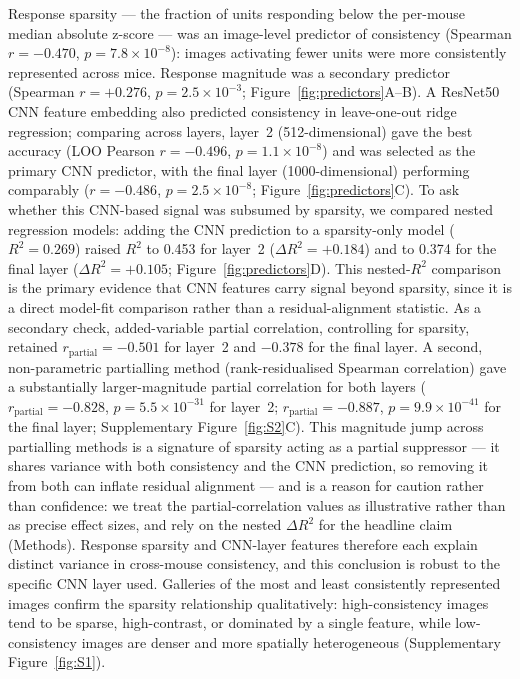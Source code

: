 \documentclass[11pt,onecolumn]{article}
\begin{document}
Response sparsity --- the fraction of units responding below the
per-mouse median absolute z-score --- was an image-level predictor of
consistency (Spearman $r = -0.470$,
$p = 7.8 \times 10^{-8}$): images activating fewer units were more
consistently represented across mice.  Response magnitude was a
secondary predictor (Spearman $r = +0.276$, $p = 2.5 \times 10^{-3}$;
Figure~\ref{fig:predictors}A--B).  A ResNet50 CNN feature embedding
also predicted consistency in leave-one-out ridge regression; comparing
across layers, layer~2 (512-dimensional) gave the best accuracy
(LOO Pearson $r = -0.496$, $p = 1.1 \times 10^{-8}$) and was selected as
the primary CNN predictor, with the final layer (1000-dimensional)
performing comparably ($r = -0.486$, $p = 2.5 \times 10^{-8}$;
Figure~\ref{fig:predictors}C).  To ask whether this CNN-based signal was
subsumed by sparsity, we compared nested regression models: adding the
CNN prediction to a sparsity-only model ($R^2 = 0.269$) raised $R^2$ to
0.453 for layer~2 ($\Delta R^2 = +0.184$) and to 0.374 for the final
layer ($\Delta R^2 = +0.105$; Figure~\ref{fig:predictors}D).  This
nested-$R^2$ comparison is the primary evidence that CNN features carry
signal beyond sparsity, since it is a direct model-fit comparison rather
than a residual-alignment statistic.  As a secondary check, added-variable
partial correlation, controlling for sparsity, retained
$r_\mathrm{partial} = -0.501$ for layer~2 and $-0.378$ for the final
layer.  A second, non-parametric partialling method (rank-residualised
Spearman correlation) gave a substantially larger-magnitude partial
correlation for both layers ($r_\mathrm{partial} = -0.828$,
$p = 5.5\times10^{-31}$ for layer~2; $r_\mathrm{partial} = -0.887$,
$p = 9.9\times10^{-41}$ for the final layer; Supplementary
Figure~\ref{fig:S2}C).  This magnitude jump across partialling methods is a
signature of sparsity acting as a partial suppressor --- it shares
variance with both consistency and the CNN prediction, so removing it
from both can inflate residual alignment --- and is a reason for caution
rather than confidence: we treat the partial-correlation values as
illustrative rather than as precise effect sizes, and rely on the
nested $\Delta R^2$ for the headline claim (Methods).  Response
sparsity and CNN-layer features therefore each explain distinct
variance in cross-mouse consistency, and this conclusion is robust to
the specific CNN layer used.  Galleries of the most and least
consistently represented images confirm the sparsity relationship
qualitatively: high-consistency images tend to be sparse, high-contrast,
or dominated by a single feature, while low-consistency images are
denser and more spatially heterogeneous (Supplementary
Figure~\ref{fig:S1}).
\end{document}
